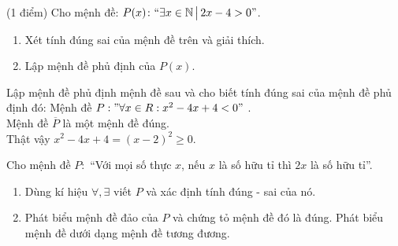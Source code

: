 \begin{bt}%
	(1 điểm) Cho mệnh đề: $P(x)\colon \text{\lq\lq}\exists x\in\mathbb{N} \,\big|\, 2x-4>0\text{\rq\rq}$.
	\begin{enumerate}
		\item Xét tính đúng sai của mệnh đề trên và giải thích.
		\item Lập mệnh đề phủ định của $P(x)$.
	\end{enumerate}
\end{bt}

\begin{bt}%
Lập mệnh đề phủ định mệnh đề sau và cho biết tính đúng sai của mệnh đề phủ định đó: Mệnh đề $P: " \forall x \in R: x ^2-4 x+4 < 0 "$
.\\
Mệnh đề $\overline{P}$ là một mệnh đề đúng.\\ Thật vậy
$x ^2-4 x+4=(x-2)^2 \geq 0$.
\end{bt}

\begin{bt}%
	Cho mệnh đề $P\colon $ ``Với mọi số thực $x$, nếu $x$ là số hữu tỉ thì $2x$ là số hữu tỉ''.
	\begin{enumerate}
		\item Dùng kí hiệu $\forall, \exists$ viết $P$ và xác định tính đúng - sai của nó.
		\item Phát biểu mệnh đề đảo của $P$ và chứng tỏ mệnh đề đó là đúng. Phát biểu mệnh đề dưới dạng mệnh đề tương đương.
	\end{enumerate}
\end{bt}

